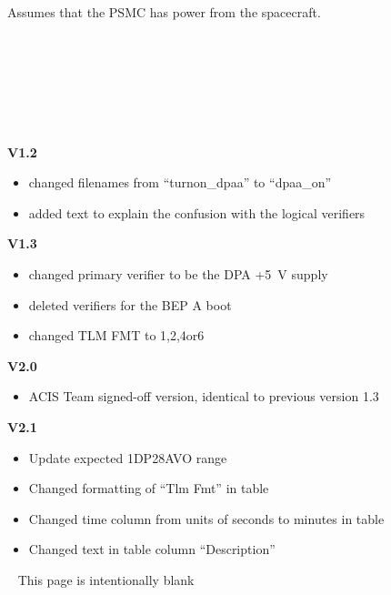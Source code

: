 \documentclass[11pt]{article}
\begin{document}
\vspace{0.15in}
\normalsize
{} \\
\normalsize
Assumes that the PSMC has power from the spacecraft. \\


\normalsize
{} \\
\normalsize


\normalsize
{} \\
\normalsize



\vspace{0.15in}
\normalsize
{} \\
\normalsize

\normalsize
{} \\
\normalsize

{\bf V1.2}
\begin{itemize}
\item changed filenames from ``turnon\_dpaa'' to
``dpaa\_on''
\item added text to explain the confusion with the logical verifiers
\end{itemize}

{\bf V1.3}
\begin{itemize}
\item changed primary verifier to be the DPA +5~V supply
\item deleted verifiers for the BEP A boot
\item changed TLM FMT to 1,2,4or6
\end{itemize}

{\bf V2.0}
\begin{itemize}
\item ACIS Team signed-off version, identical to previous version 1.3
\end{itemize}

{\bf V2.1}
\begin{itemize}
\item Update expected 1DP28AVO range
\item Changed formatting of ``Tlm Fmt'' in table
\item Changed time column from units of seconds to minutes in table
\item Changed text in table column ``Description''
\end{itemize}

\newpage\
\vspace{0.4\textheight}
\bc This page is intentionally blank \ec

\newcommand{\tablecaptiontext}{TURN ON DPA A (realtime version)}

\end{document}
